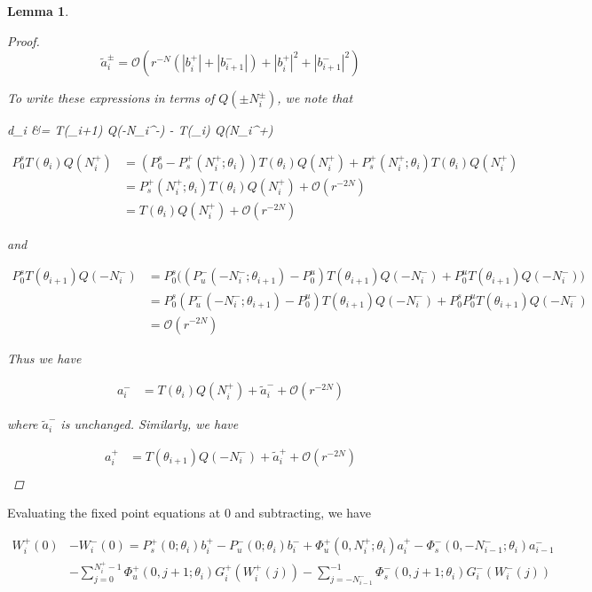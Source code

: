 \documentclass[12pt]{article}
\newtheorem{lemma}{Lemma}
\begin{document}
\begin{lemma}
\begin{proof}
\[
\tilde{a}_i^\pm = \mathcal{O}(r^{-N}(|b_i^+|+|b_{i+1}^-|) + |b_i^+|^2+|b_{i+1}^-|^2) 
\]

To write these expressions in terms of $Q(\pm N_i^\pm)$, we note that

d_i &= T(\theta_{i+1}) Q(-N_i^-) - T(\theta_i) Q(N_i^+)

\begin{align*}
P_0^s T(\theta_i) Q(N_i^+) &= (P_0^s - P_s^+(N_i^+; \theta_i)) T(\theta_i) Q(N_i^+) + P_s^+(N_i^+; \theta_i) T(\theta_i) Q(N_i^+) \\
&= P_s^+(N_i^+; \theta_i) T(\theta_i) Q(N_i^+) + \mathcal{O}(r^{-2N}) \\
&= T(\theta_i) Q(N_i^+) + \mathcal{O}(r^{-2N}) 
\end{align*}

and 

\begin{align*}
P_0^s T(\theta_{i+1}) Q(-N_i^-) 
&= P_0^s \Big( ( P_u^-(-N_i^-; \theta_{i+1}) - P_0^u) T(\theta_{i+1}) Q(-N_i^-) + P_0^u T(\theta_{i+1}) Q(-N_i^-) \Big) \\
&= P_0^s ( P_u^-(-N_i^-; \theta_{i+1}) - P_0^u) T(\theta_{i+1}) Q(-N_i^-) + P_0^s P_0^u T(\theta_{i+1}) Q(-N_i^-) \\
&= \mathcal{O}(r^{-2N})
\end{align*}

Thus we have

\begin{align*}
a_i^- &= T(\theta_i) Q(N_i^+) + \tilde{a}_i^- + \mathcal{O}(r^{-2N})
\end{align*}

where $\tilde{a}_i^-$ is unchanged. Similarly, we have

\begin{align*}
a_i^+ &= T(\theta_{i+1}) Q(-N_i^-) + \tilde{a}_i^+ + \mathcal{O}(r^{-2N}) \\
\end{align*}

\end{proof}
\end{lemma}


Evaluating the fixed point equations at 0 and subtracting, we have

\begin{align*}
W_i^+(0) &- W_i^-(0) = P_s^+(0; \theta_i) b_i^+ - P_u^-(0; \theta_i) b_i^- 
+ \Phi_u^+(0, N_i^+; \theta_i) a_i^+ - \Phi_s^-(0, -N_{i-1}^-; \theta_i) a_{i-1}^- \\
&- \sum_{j = 0}^{N_i^+-1} \Phi_u^+(0, j+1; \theta_i) G_i^+(W_i^+(j)) 
- \sum_{j = -N_{i-1}^-}^{-1} \Phi_s^-(0, j+1; \theta_i) G_i^-(W_i^-(j)) \\
\end{align*}
\end{document}

